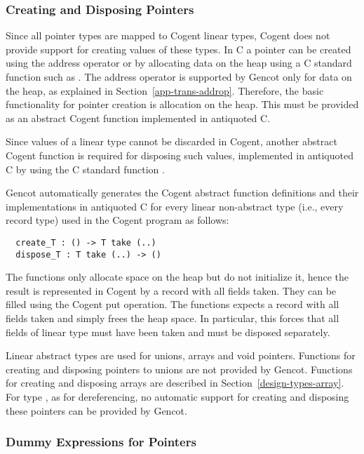 \subsubsection{Creating and Disposing Pointers}

Since all pointer types are mapped to Cogent linear types, Cogent does not provide support for creating values
of these types. In C a pointer can be created using the address operator \code{\&} or by allocating data on
the heap using a C standard function such as . The address operator is supported by Gencot
only for data on the heap, as explained in Section~\ref{app-trans-addrop}. Therefore, the basic functionality
for pointer creation is allocation on the heap. This must be provided as an abstract Cogent function implemented
in antiquoted C.

Since values of a linear type cannot be discarded in Cogent, another abstract Cogent function is required for
disposing such values, implemented in antiquoted C by using the C standard function .

Gencot automatically generates the Cogent abstract function definitions and their implementations in antiquoted
C for every linear non-abstract type  (i.e., every record type) used in the Cogent program as follows:
\begin{verbatim}
  create_T : () -> T take (..)
  dispose_T : T take (..) -> ()
\end{verbatim}
The  functions only allocate space on the heap but do not initialize it, hence the result is 
represented in Cogent by a record with all fields taken. They can be filled using the Cogent put operation.
The  functions expects a record with all fields taken and simply frees the heap space. In particular,
this forces that all fields of linear type must have been taken and must be disposed separately.

Linear abstract types are used for unions, arrays and void pointers. Functions for creating and disposing pointers
to unions are not provided by Gencot. Functions for creating and disposing arrays are described in 
Section~\ref{design-types-array}.
For type , as for dereferencing, no
automatic support for creating and disposing these pointers can be provided by Gencot.

\subsubsection{Dummy Expressions for Pointers}

